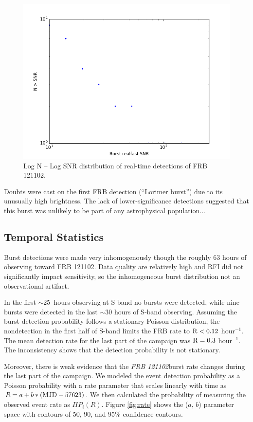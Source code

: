\documentclass{emulateapj}
\newcommand{\frb}{\emph{FRB 121102}}
\begin{document}
\begin{figure}[htb]
\begin{center}
\includegraphics[width=0.9\columnwidth]{logns}
\caption{Log N -- Log SNR distribution of real-time detections of FRB 121102.
\label{fig:logns}}
\end{center}
\end{figure}

Doubts were cast on the first FRB detection (``Lorimer burst'') due to its unusually high brightness. The lack of lower-significance detections suggested that this burst was unlikely to be part of any astrophysical population...

\subsection{Temporal Statistics}

Burst detections were made very inhomogenously though the roughly 63 hours of observing toward FRB 121102. Data quality are relatively high and RFI did not significantly impact sensitivity, so the inhomogeneous burst distribution not an observational artifact.

In the first $\sim25$\ hours observing at S-band no bursts were detected, while nine bursts were detected in the last $\sim30$ hours of S-band observing. Assuming the burst detection probability follows a stationary Poisson distribution, the nondetection in the first half of S-band limits the FRB rate to $\rm{R}<0.12$ hour$^{-1}$. The mean detection rate for the last part of the campaign was $\rm{R}=0.3$ hour$^{-1}$. The inconsistency shows that the detection probability is not stationary.

Moreover, there is weak evidence that the \frb burst rate changes during the last part of the campaign. We modeled the event detection probability as a Poisson probability with a rate parameter that scales linearly with time as $R=a + b*(\rm{MJD} - 57623)$. We then calculated the probability of measuring the observed event rate as $\Pi P_i(R)$. Figure \ref{fig:rate} shows the ($a$, $b$) parameter space with contours of 50, 90, and 95\% confidence contours. 
\end{document}
